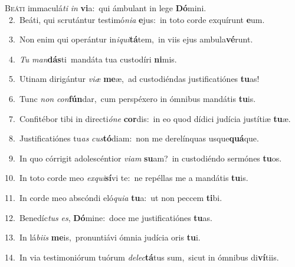 \lettrine{\initial\textcolor{\initialcolor}{B}}{eáti} immaculá\textit{ti} \textit{in} \textbf{vi}\-a:~\star qui ámbulant in lege \textbf{Dó}\-mini.\\
{\numbfont\textcolor{\numbcolor}{~2.}}~Beáti, qui scrutántur testimó\-\textit{ni}\-\textit{a} \textbf{e}\-jus:~\star in toto corde exquírunt \textbf{e}\-um.\par
{\numbfont\textcolor{\numbcolor}{~3.}}~Non enim qui operántur in\-\textit{i}\-\textit{qui}\textbf{tá}tem,~\star in viis ejus ambula\-\textbf{vé}\-runt.\par
{\numbfont\textcolor{\numbcolor}{~4.}}~\textit{Tu} \textit{man}\-\textbf{dás}ti~\star mandáta tua custodíri \textbf{ni}\-mis.\par
{\numbfont\textcolor{\numbcolor}{~5.}}~Utinam dirigántur \textit{vi}\-\textit{æ} \textbf{me}\-æ,~\star ad custodiéndas justificatiónes \textbf{tu}\-as!\par
{\numbfont\textcolor{\numbcolor}{~6.}}~Tunc \textit{non} \textit{con}\-\textbf{fún}dar,~\star cum perspéxero in ómnibus mandátis \textbf{tu}\-is.\par
{\numbfont\textcolor{\numbcolor}{~7.}}~Confitébor tibi in directi\-\textit{ó}\-\textit{ne} \textbf{cor}\-dis:~\star in eo quod dídici judícia justítiæ \textbf{tu}\-æ.\par
{\numbfont\textcolor{\numbcolor}{~8.}}~Justificatiónes tu\textit{as} \textit{cus}\-\textbf{tó}diam:~\star non me derelínquas usque\-\textbf{quá}\-que.\par
{\numbfont\textcolor{\numbcolor}{~9.}}~In quo córrigit adolescéntior \textit{vi}\-\textit{am} \textbf{su}\-am?~\star in custodiéndo sermónes \textbf{tu}\-os.\par
{\numbfont\textcolor{\numbcolor}{10.}}~In toto corde meo \textit{ex}\-\textit{qui}\textbf{sí}vi te:~\star ne repéllas me a mandátis \textbf{tu}\-is.\par
{\numbfont\textcolor{\numbcolor}{11.}}~In corde meo abscóndi eló\-\textit{qui}\-\textit{a} \textbf{tu}\-a:~\star ut non peccem \textbf{ti}\-bi.\par
{\numbfont\textcolor{\numbcolor}{12.}}~Benedíc\textit{tus} \textit{es}\-, \textbf{Dó}\-mine:~\star doce me justificatiónes \textbf{tu}\-as.\par
{\numbfont\textcolor{\numbcolor}{13.}}~In lá\-\textit{bi}\-\textit{is} \textbf{me}\-is,~\star pronuntiávi ómnia judícia oris \textbf{tu}\-i.\par
{\numbfont\textcolor{\numbcolor}{14.}}~In via testimoniórum tuórum \textit{de}\-\textit{lec}\textbf{tá}tus sum,~\star sicut in ómnibus di\-\textbf{ví}\-tiis.\par
